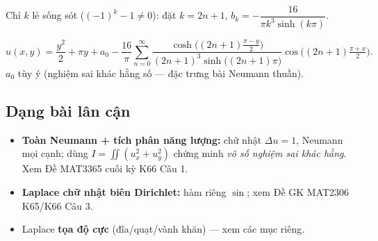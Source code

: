 Chỉ $k$ lẻ sống sót ($(-1)^k-1\ne0$): đặt $k=2n+1$, $b_k=-\dfrac{16}{\pi k^3\sinh(k\pi)}$.
\begin{nhobox}
\[
  u(x,y)=\frac{y^2}{2}+\pi y+a_0
  -\frac{16}{\pi}\sum_{n=0}^{\infty}
  \frac{\cosh\!\big((2n{+}1)\tfrac{\pi-y}{2}\big)}{(2n+1)^3\sinh\!\big((2n+1)\pi\big)}
  \cos\!\big((2n{+}1)\tfrac{\pi+x}{2}\big).
\]
$a_0$ tùy ý (nghiệm sai khác hằng số --- đặc trưng bài Neumann thuần).
\end{nhobox}

\subsection*{Dạng bài lân cận}
\begin{itemize}
\item \textbf{Toàn Neumann + tích phân năng lượng:} chữ nhật $\Delta u=1$, Neumann mọi cạnh; dùng $I=\iint(u_x^2+u_y^2)$ chứng minh \emph{vô số nghiệm sai khác hằng}. Xem Đề MAT3365 cuối kỳ K66 Câu 1.
\item \textbf{Laplace chữ nhật biên Dirichlet:} hàm riêng $\sin$; xem Đề GK MAT2306 K65/K66 Câu 3.
\item Laplace \textbf{tọa độ cực} (đĩa/quạt/vành khăn) --- xem các mục riêng.
\end{itemize}
